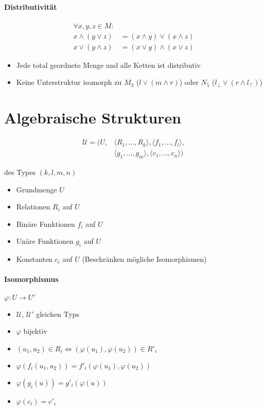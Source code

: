 \paragraph{Distributivität}

\begin{align*}
  \forall x, y, z \in M:                              \\
  x \land (y \lor z) & = (x \land y) \lor (x \land z) \\
  x \lor (y \land z) & = (x \lor y) \land (x \lor z)
\end{align*}

\begin{itemize}
  \item Jede total geordnete Menge und alle Ketten ist distributiv
  \item Keine Unterstruktur isomorph zu $M_3$ ($l \lor (m \land r)$) oder $N_5$ ($l_\bot \lor (r \land l_\top)$)
\end{itemize}

\section{Algebraische Strukturen}

\begin{align*}
  \mathcal{U} = (U, & \langle R_1, \dots, R_k \rangle, \langle f_1, \dots, f_l \rangle, \\
                    & \langle g_1, \dots, g_m \rangle, \langle c_1, \dots, c_n \rangle)
\end{align*}

des Types $(k, l, m, n)$

\begin{itemize}
  \item Grundmenge $U$
  \item Relationen $R_i$ auf $U$
  \item Binäre Funktionen $f_i$ auf $U$
  \item Unäre Funktionen $g_i$ auf $U$
  \item Konstanten $c_i$ auf $U$ (Beschränken mögliche Isomorphismen)
\end{itemize}

\paragraph{Isomorphismus} $\varphi: U \rightarrow U'$

\begin{itemize}
  \item $\mathcal{U}$, $\mathcal{U'}$ gleichen Typs
  \item $\varphi$ bijektiv
  \item $(u_1, u_2) \in R_i \Leftrightarrow (\varphi (u_1), \varphi (u_2)) \in R'_i$
  \item $\varphi(f_i(u_1, u_2)) = f'_i(\varphi(u_1), \varphi(u_2))$
  \item $\varphi(g_i(u)) = g'_i(\varphi(u))$
  \item $\varphi(c_i) = c'_i$
\end{itemize}

